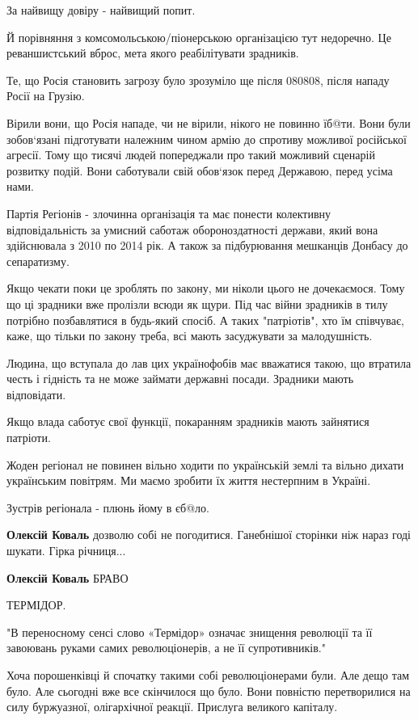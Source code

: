 \begin{itemize}
За найвищу довіру - найвищий попит.

Й порівняння з комсомольською/піонерською організацією тут недоречно. Це
реваншистський вброс, мета якого реабілітувати зрадників.

Те, що Росія становить загрозу було зрозуміло ще після 080808, після нападу
Росії на Грузію.

Вірили вони, що Росія нападе, чи не вірили, нікого не повинно їб@ти. Вони були
зобов`язані підготувати належним чином армію до спротиву можливої російської
агресії. Тому що тисячі людей попереджали про такий можливий сценарій розвитку
подій. Вони саботували свій обов`язок перед Державою, перед усіма нами.

Партія Регіонів - злочинна організація та має понести колективну
відповідальність за умисний саботаж обороноздатності держави, який вона
здійснювала з 2010 по 2014 рік. А також за підбурювання мешканців Донбасу до
сепаратизму.

Якщо чекати поки це зроблять по закону, ми ніколи цього не дочекаємося. Тому що
ці зрадники вже пролізли всюди як щури. Під час війни зрадників в тилу потрібно
позбавлятися в будь-який спосіб. А таких "патріотів", хто їм співчуває, каже,
що тільки по закону треба, всі мають засуджувати за малодушність.

Людина, що вступала до лав цих українофобів має вважатися такою, що втратила
честь і гідність та не може займати державні посади. Зрадники мають
відповідати.

Якщо влада саботує свої функції, покаранням зрадників мають зайнятися патріоти.

Жоден регіонал не повинен вільно ходити по українській землі та вільно дихати
українським повітрям. Ми маємо зробити їх життя нестерпним в Україні.

Зустрів регіонала - плюнь йому в єб@ло.

\begin{itemize} %
\textbf{Олексій Коваль} дозволю собі не погодитися. Ганебнішої сторінки ніж нараз годі шукати. Гірка річниця...

\textbf{Олексій Коваль} БРАВО


ТЕРМІДОР.

"В переносному сенсі слово «Термідор» означає знищення революції та її
завоювань руками самих революціонерів, а не її супротивників."

Хоча порошенківці й спочатку такими собі революціонерами були. Але дещо там
було. Але сьогодні вже все скінчилося що було. Вони повністю перетворилися на
силу буржуазної, олігархічної реакції. Прислуга великого капіталу.


\end{itemize}
\end{itemize}
